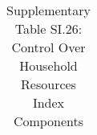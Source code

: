 \begin{longtable}{llcccccccccc}
\caption{Supplementary Table SI.26: Control Over Household Resources Index Components} \label{tab:pap__b10_6} \\                                                                                                                                                                                                                                                                                                                                                                                                                                                                                                                                                                                                                                                                                                                                                                          
\hline \hline                                                                                                                                                                                                                                                                                                                                                                                                                                                                                                                                                                                                                                                                                                                                                                                                                                                                             

\end{longtable}
